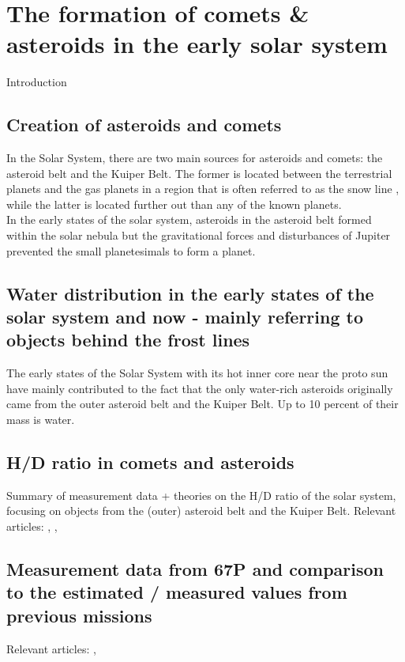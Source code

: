 
\section{The formation of comets \& asteroids in the early solar system}
Introduction\\

\subsection{Creation of asteroids and comets}
In the Solar System, there are two main sources for asteroids and comets: the asteroid belt and the Kuiper Belt. The former is located between the terrestrial planets and the gas planets in a region that is often referred to as the snow line \cite{asteroid_belts}, while the latter is located further out than any of the known planets.\\
In the early states of the solar system, asteroids in the asteroid belt formed within the solar nebula but the gravitational forces and disturbances of Jupiter prevented the small planetesimals to form a planet. 


\subsection{Water distribution in the early states of the solar system and now - mainly referring to objects behind the frost lines}
The early states of the Solar System with its hot inner core near the proto sun have mainly contributed to the fact that the only water-rich asteroids originally came from the outer asteroid belt and the Kuiper Belt. Up to 10 percent of their mass is water. \cite{timescale}

\subsection{H/D ratio in comets and asteroids}
Summary of measurement data + theories on the H/D ratio of the solar system, focusing on objects from the (outer) asteroid belt and the Kuiper Belt. 
Relevant articles: \cite{water_Hartley2_nature}, \cite{ice_67P_science}, \cite{D/H_67P_science}

\subsection{Measurement data from 67P and comparison to the estimated / measured values from previous missions}
Relevant articles: \cite{ice_67P_science}, \cite{D/H_67P_science}
